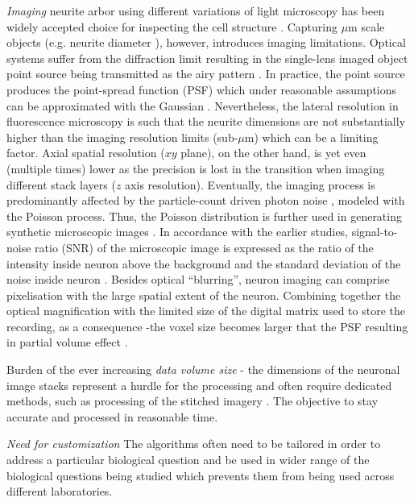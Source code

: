 \textit{Imaging} neurite arbor using different variations of light microscopy has been widely accepted choice for inspecting the cell structure \cite{meijering2010neuron,donohue2011automated}. Capturing $\mu$m scale objects (e.g. neurite diameter \cite{ascolitrees}), however, introduces imaging limitations. Optical systems suffer from the diffraction limit resulting in the single-lens imaged object point source being transmitted as the airy pattern \cite{cox2012optical}. In practice, the point source produces the point-spread function (PSF) which under reasonable assumptions can be approximated with the Gaussian \cite{zhang2007gaussian}. Nevertheless, the lateral resolution in fluorescence microscopy is such that the neurite dimensions are not substantially higher than the imaging resolution limits (sub-$\mu$m) which can be a limiting factor. Axial spatial resolution ($xy$ plane), on the other hand, is yet even (multiple times) lower as the precision is lost in the transition when imaging different stack layers ($z$ axis resolution). Eventually, the imaging process is predominantly affected by the particle-count driven photon noise \cite{van1998digital}, modeled with the Poisson process. Thus, the Poisson distribution is further used in generating synthetic microscopic images \cite{smal2010quantitative}. In accordance with the earlier studies, signal-to-noise ratio (SNR) of the microscopic image is expressed as the ratio of the intensity inside neuron above the background and the standard deviation of the noise inside neuron \cite{cheezum2001quantitative,smal2010quantitative}. Besides optical ``blurring'', neuron imaging can comprise pixelisation with the large spatial extent of the neuron. Combining together the optical magnification with the limited size of the digital matrix used to store the recording, as a consequence -the voxel size becomes larger that the PSF resulting in partial volume effect .

Burden of the ever increasing \textit{data volume size} - the dimensions of the neuronal image stacks \cite{peng2017automatic} represent a hurdle for the processing and often require dedicated methods, such as processing of the stitched imagery \cite{zhou2015neuron}. The objective to stay accurate and processed in reasonable time.

\textit{Need for customization} The algorithms often need to be tailored in order to address a particular biological question and be used in wider range of the biological questions being studied which prevents them from being used across different laboratories.

